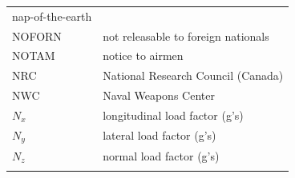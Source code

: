 \documentclass[
]{book}
\begin{document}
\begin{longtable}[]{@{}ll@{}}
\begin{minipage}[t]{0.47\columnwidth}
nap-of-the-earth\strut
\end{minipage}\tabularnewline
\begin{minipage}[t]{0.47\columnwidth}\raggedright
NOFORN\strut
\end{minipage} & \begin{minipage}[t]{0.47\columnwidth}\raggedright
not releasable to foreign nationals\strut
\end{minipage}\tabularnewline
\begin{minipage}[t]{0.47\columnwidth}\raggedright
NOTAM\strut
\end{minipage} & \begin{minipage}[t]{0.47\columnwidth}\raggedright
notice to airmen\strut
\end{minipage}\tabularnewline
\begin{minipage}[t]{0.47\columnwidth}\raggedright
NRC\strut
\end{minipage} & \begin{minipage}[t]{0.47\columnwidth}\raggedright
National Research Council (Canada)\strut
\end{minipage}\tabularnewline
\begin{minipage}[t]{0.47\columnwidth}\raggedright
NWC\strut
\end{minipage} & \begin{minipage}[t]{0.47\columnwidth}\raggedright
Naval Weapons Center\strut
\end{minipage}\tabularnewline
\begin{minipage}[t]{0.47\columnwidth}\raggedright
\(N_x\)\strut
\end{minipage} & \begin{minipage}[t]{0.47\columnwidth}\raggedright
longitudinal load factor (g's)\strut
\end{minipage}\tabularnewline
\begin{minipage}[t]{0.47\columnwidth}\raggedright
\(N_y\)\strut
\end{minipage} & \begin{minipage}[t]{0.47\columnwidth}\raggedright
lateral load factor (g's)\strut
\end{minipage}\tabularnewline
\begin{minipage}[t]{0.47\columnwidth}\raggedright
\(N_z\)\strut
\end{minipage} & \begin{minipage}[t]{0.47\columnwidth}\raggedright
normal load factor (g's)\strut
\end{minipage}\tabularnewline
\begin{minipage}[t]{0.47\columnwidth}\raggedright

\end{minipage}
\end{longtable}
\end{document}
